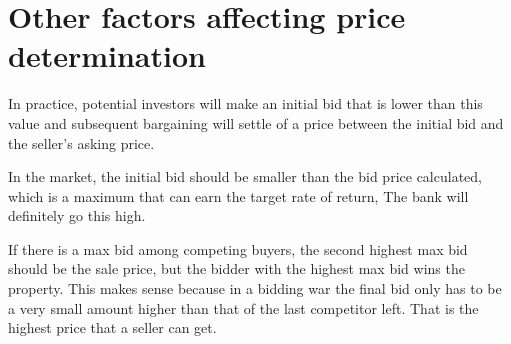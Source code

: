 



\section{Other factors affecting price determination}

In practice, potential investors will make an  initial  bid that is lower than this value and subsequent bargaining will settle of a price between the initial bid and the seller's asking price.

In the market, the initial bid should be smaller than the bid price calculated, which is a maximum that can earn the target rate of return, The bank will definitely go this high. 

If there is a  max bid among competing buyers, the second highest max bid should be the sale price, but the bidder with the highest max bid wins the property. This makes sense because in a bidding war the final bid only has to be a very small amount higher than that of the last competitor left.
That is the highest price that a seller can get.

